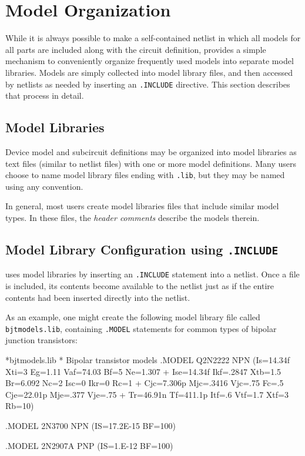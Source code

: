 \clearpage
\section{Model Organization}
\label{Model_Organization}

While it is always possible to make a self-contained netlist in which
all models for all parts are included along with the circuit
definition, \Xyce{} provides a simple mechanism to conveniently organize
frequently used models into separate model libraries.  Models are simply
collected into model library files, and then accessed by netlists as needed by
inserting an \texttt{.INCLUDE} directive.  This
section describes that process in detail.

\subsection{Model Libraries}

Device model and subcircuit definitions may be organized into model
libraries as text files (similar to netlist files) with one or more model
definitions. Many users choose to name model library files ending with
\texttt{.lib}, but they may be named using any convention.

In general, most users create model libraries files that include similar model
types.  In these files, the {\em header comments} describe the models therein.  

\subsection{Model Library Configuration using \texttt{.INCLUDE}}

\Xyce{} uses model libraries by inserting an \texttt{.INCLUDE}
statement into a netlist.  Once a file is included, its contents become
available to the netlist just as if the entire contents had been
inserted directly into the netlist.

As an example, one might create the following model library file
called \texttt{bjtmodels.lib}, containing \texttt{.MODEL} statements for
common types of bipolar junction transistors:

\begin{vquote}
*bjtmodels.lib
* Bipolar transistor models
.MODEL Q2N2222 NPN (Is=14.34f Xti=3 Eg=1.11 Vaf=74.03 Bf=5 Ne=1.307
+  Ise=14.34f Ikf=.2847 Xtb=1.5 Br=6.092 Nc=2 Isc=0 Ikr=0 Rc=1
+  Cjc=7.306p Mjc=.3416 Vjc=.75 Fc=.5 Cje=22.01p Mje=.377 Vje=.75
+  Tr=46.91n Tf=411.1p Itf=.6 Vtf=1.7 Xtf=3 Rb=10)

.MODEL 2N3700 NPN (IS=17.2E-15 BF=100)

.MODEL 2N2907A PNP (IS=1.E-12 BF=100)
\end{vquote}

